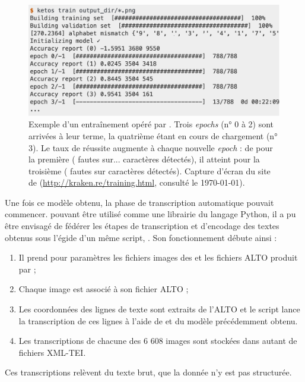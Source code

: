 \begin{figure}
    \centering
    \includegraphics[width=15cm]{img/kraken_training.png}
    \caption{Exemple d'un entraînement opéré par \kraken. Trois \textit{epochs} (n° 0 à 2) sont arrivées à leur terme, la quatrième étant en cours de chargement (n° 3). Le taux de réussite augmente à chaque nouvelle \textit{epoch} : de  pour la première ( fautes sur...  caractères détectés), il atteint  pour la troisième ( fautes sur  caractères détectés). Capture d'écran du site de \kraken{} (\url{http://kraken.re/training.html}, consulté le \today).}
    \label{fig:kraken_training}
\end{figure}

Une fois ce modèle obtenu, la phase de transcription automatique pouvait commencer. \kraken{} pouvant être utilisé comme une librairie du langage Python, il a pu être envisagé de fédérer les étapes de transcription et d'encodage des textes obtenus sous l'égide d'un même script, \lse. Son fonctionnement débute ainsi :

\begin{enumerate}
    \item Il prend pour paramètres les fichiers images des \odm{} et les fichiers ALTO produit par \transkribus ;
    \item Chaque image est associé à son fichier ALTO ;
    \item Les coordonnées des lignes de texte sont extraits de l'ALTO et le script lance la transcription de ces lignes à l'aide de \kraken{} et du modèle précédemment obtenu.
    \item Les transcriptions de chacune des 6 608 images sont stockées dans autant de fichiers XML-TEI.
\end{enumerate}

Ces transcriptions relèvent du texte brut, \cad{} que la donnée n'y est pas structurée.

